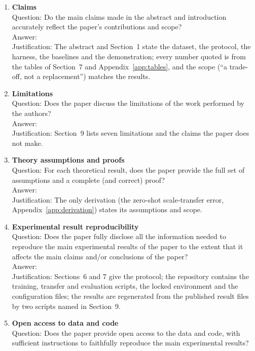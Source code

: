 \documentclass{article}
\begin{document}
\begin{enumerate}
\item {\bf Claims}\\
    Question: Do the main claims made in the abstract and introduction accurately reflect the paper's contributions and scope?\\
    Answer: \answerYes{}\\
    Justification: The abstract and Section~1 state the dataset, the protocol, the harness, the baselines and the demonstration; every number quoted is from the tables of Section~7 and Appendix~\ref{app:tables}, and the scope (``a trade-off, not a replacement'') matches the results.
\item {\bf Limitations}\\
    Question: Does the paper discuss the limitations of the work performed by the authors?\\
    Answer: \answerYes{}\\
    Justification: Section~9 lists seven limitations and the claims the paper does not make.
\item {\bf Theory assumptions and proofs}\\
    Question: For each theoretical result, does the paper provide the full set of assumptions and a complete (and correct) proof?\\
    Answer: \answerYes{}\\
    Justification: The only derivation (the zero-shot scale-transfer error, Appendix~\ref{app:derivation}) states its assumptions and scope.
\item {\bf Experimental result reproducibility}\\
    Question: Does the paper fully disclose all the information needed to reproduce the main experimental results of the paper to the extent that it affects the main claims and/or conclusions of the paper?\\
    Answer: \answerYes{}\\
    Justification: Sections~6 and 7 give the protocol; the repository contains the training, transfer and evaluation scripts, the locked environment and the configuration files; the results are regenerated from the published result files by two scripts named in Section~9.
\item {\bf Open access to data and code}\\
    Question: Does the paper provide open access to the data and code, with sufficient instructions to faithfully reproduce the main experimental results?\\

\end{enumerate}
\end{document}
